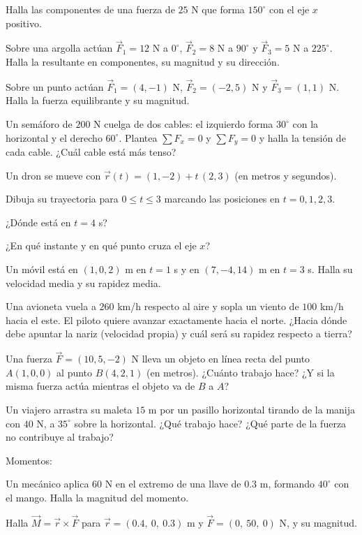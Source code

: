 \documentclass[11pt,a4paper]{article}
\newcommand{\vF}{\vec{F}}\newcommand{\vr}{\vec{r}}\newcommand{\vd}{\vec{d}}\newcommand{\vR}{\vec{R}}
\newcommand{\vM}{\vec{M}}
\begin{document}
\taller
\begin{ejercicios}
\item Halla las componentes de una fuerza de $25$ N que forma $150^\circ$ con el eje $x$ positivo.
\item Sobre una argolla actúan $\vF_1=12$ N a $0^\circ$, $\vF_2=8$ N a $90^\circ$ y $\vF_3=5$ N a $225^\circ$.
  Halla la resultante en componentes, su magnitud y su dirección.
\item Sobre un punto actúan $\vF_1=(4,-1)$ N, $\vF_2=(-2,5)$ N y $\vF_3=(1,1)$ N. Halla la fuerza equilibrante y su magnitud.
\item Un semáforo de $200$ N cuelga de dos cables: el izquierdo forma $30^\circ$ con la horizontal y el derecho $60^\circ$.
  Plantea $\sum F_x=0$ y $\sum F_y=0$ y halla la tensión de cada cable. ¿Cuál cable está más tenso?
\item Un dron se mueve con $\vr(t)=(1,-2)+t\,(2,3)$ (en metros y segundos).
  \begin{ejercicios}
  \item Dibuja su trayectoria para $0\le t\le3$ marcando las posiciones en $t=0,1,2,3$.
  \item ¿Dónde está en $t=4$ s?
  \item ¿En qué instante y en qué punto cruza el eje $x$?
  \end{ejercicios}
\item Un móvil está en $(1,0,2)$ m en $t=1$ s y en $(7,-4,14)$ m en $t=3$ s. Halla su velocidad media y su rapidez media.
\item Una avioneta vuela a $260$ km/h respecto al aire y sopla un viento de $100$ km/h hacia el este. El piloto quiere
  avanzar exactamente hacia el norte. ¿Hacia dónde debe apuntar la nariz (velocidad propia) y cuál será su rapidez
  respecto a tierra?
\item Una fuerza $\vF=(10,5,-2)$ N lleva un objeto en línea recta del punto $A(1,0,0)$ al punto $B(4,2,1)$ (en metros).
  ¿Cuánto trabajo hace? ¿Y si la misma fuerza actúa mientras el objeto va de $B$ a $A$?
\item Un viajero arrastra su maleta $15$ m por un pasillo horizontal tirando de la manija con $40$ N, a $35^\circ$ sobre
  la horizontal. ¿Qué trabajo hace? ¿Qué parte de la fuerza no contribuye al trabajo?
\item Momentos:
  \begin{ejercicios}
  \item Un mecánico aplica $60$ N en el extremo de una llave de $0.3$ m, formando $40^\circ$ con el mango. Halla la
    magnitud del momento.
  \item Halla $\vM=\vr\times\vF$ para $\vr=(0.4,\ 0,\ 0.3)$ m y $\vF=(0,\ 50,\ 0)$ N, y su magnitud.
  \end{ejercicios}
\end{ejercicios}
\end{document}
